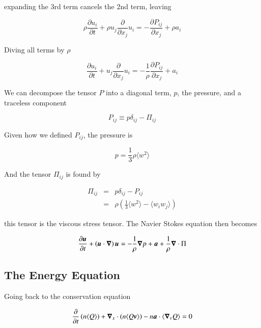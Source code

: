 \noindent expanding the 3rd term cancels the 2nd term, leaving 

\begin{equation}
\rho \frac{\partial u_i}{\partial t}  + \rho  u_j\frac{\partial}{\partial x_j}u_i = -\frac{\partial P_{ij}}{\partial x_j}  + \rho a_i 
\end{equation}


\noindent Diving all terms by $\rho$ 


\begin{equation}
\frac{\partial u_i}{\partial t}  +  u_j\frac{\partial}{\partial x_j}u_i = -\frac{1}{\rho}\frac{\partial P_{ij}}{\partial x_j}  + a_i 
\end{equation}

\noindent We can decompose the tensor $P$ into a diagonal term, $p$, the pressure, and a traceless component 

\begin{equation}
P_{ij} \equiv p \delta_{ij} - \Pi_{ij} 
\end{equation}

\noindent Given how we defined $P_{ij}$, the pressure is 

\begin{equation}
p =  \frac{1}{3} \rho \langle w^2 \rangle
\end{equation}

\noindent And the tensor $\Pi_{ij}$ is found by 

\begin{eqnarray}
\Pi_{ij} &=& p \delta_{ij} - P_{ij}  \\
&=&\rho\left(\frac{1}{3}\langle w^2 \rangle - \langle w_i w_j \rangle \right)
\end{eqnarray}

\noindent this tensor is the viscous stress tensor. The Navier Stokes equation then becomes


\begin{equation}
\frac{\partial {\boldsymbol{u}}}{\partial t}  +  \left({\boldsymbol{u}}\cdot {\boldsymbol{\nabla}}\right) {\boldsymbol{u}} = -\frac{1}{\rho} {\boldsymbol{\nabla}} p  + {\boldsymbol{a}} +\frac{1}{\rho}{\boldsymbol{\nabla}}\cdot\Pi
\end{equation}

\subsection{The Energy Equation}

Going back to the conservation equation 

\begin{equation}
\frac{\partial }{\partial t} \left(n\langle Q \rangle\right) + {\boldsymbol{\nabla}}_x \cdot \left(n\langle Q  {\boldsymbol{v}} \rangle\right) - n{\boldsymbol{a}}\cdot \langle {\boldsymbol{\nabla}}_v Q \rangle = 0 
\end{equation}

